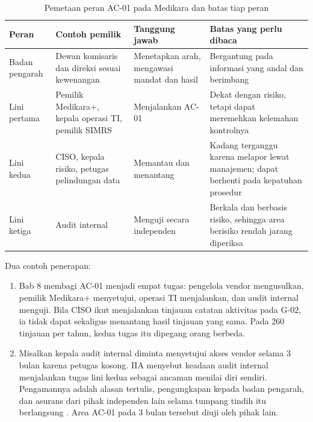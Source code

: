 \begin{table}[!htb]
  \centering\small
  \caption{Pemetaan peran AC-01 pada Medikara dan batas tiap peran}\label{tab:ch12-three-lines}
  \begin{tabularx}{\textwidth}{|>{\raggedright\arraybackslash}p{}|>{\raggedright\arraybackslash}p{}|>{\raggedright\arraybackslash}X|>{\raggedright\arraybackslash}X|}
    \hline
    \textbf{Peran} & \textbf{Contoh pemilik} & \textbf{Tanggung jawab} & \textbf{Batas yang perlu
    dibaca} \\ \hline
    Badan pengarah & Dewan komisaris dan direksi sesuai kewenangan & Menetapkan arah, mengawasi
    mandat dan hasil & Bergantung pada informasi yang andal dan berimbang \\ \hline
    Lini pertama & Pemilik Medikara+, kepala operasi TI, pemilik SIMRS & Menjalankan AC-01 & Dekat
    dengan risiko, tetapi dapat meremehkan kelemahan kontrolnya \\ \hline
    Lini kedua & CISO, kepala risiko, petugas pelindungan data & Memantau dan menantang & Kadang
    terganggu karena melapor lewat manajemen; dapat berhenti pada kepatuhan prosedur \\ \hline
    Lini ketiga & Audit internal & Menguji secara independen & Berkala dan berbasis risiko,
    sehingga area berisiko rendah jarang diperiksa \\ \hline
  \end{tabularx}
\end{table}

Dua contoh penerapan:
\begin{enumerate}
  \item Bab 8 membagi AC-01 menjadi empat tugas: pengelola vendor mengusulkan, pemilik Medikara+
  menyetujui, operasi TI menjalankan, dan audit internal menguji. Bila CISO ikut menjalankan
  tinjauan catatan aktivitas pada G-02, ia tidak dapat sekaligus menantang hasil tinjauan yang
  sama. Pada 260 tinjauan per tahun, kedua tugas itu dipegang orang berbeda.
  \item Misalkan kepala audit internal diminta menyetujui akses vendor selama 3 bulan karena
  petugas kosong. IIA menyebut keadaan audit internal menjalankan tugas lini kedua sebagai ancaman
  menilai diri sendiri. Pengamannya adalah alasan tertulis, pengungkapan kepada badan pengarah,
  dan asurans dari pihak independen lain selama tumpang tindih itu berlangsung
  \cite{iia-tlm2026}. Area AC-01 pada 3 bulan tersebut diuji oleh pihak lain.
\end{enumerate}

